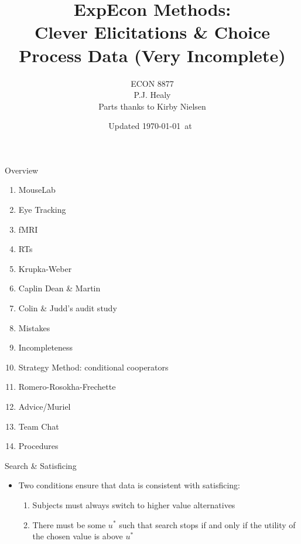 

\title[Incentives in Experiments: Theory]{ExpEcon Methods:\\Clever Elicitations \& Choice Process Data (Very Incomplete)}\author[ECON 8877]{ECON 8877\\P.J. Healy\\Parts thanks to Kirby Nielsen} \color{metrop}
\institute[OSU]{}
\date[]{\vfill {\tiny Updated \today\ at\ \DTMcurrenttime}}



\frame{\maketitle}

\begin{frame}{Overview}
\begin{enumerate}
    \item MouseLab
    \item Eye Tracking
    \item fMRI
    \item RTs
    \item Krupka-Weber
    \item Caplin Dean \& Martin
    \item Colin \& Judd's audit study
    \item Mistakes
    \item Incompleteness
    \item Strategy Method: conditional cooperators
    \item Romero-Rosokha-Frechette
    \item Advice/Muriel
    \item Team Chat
    \item Procedures
\end{enumerate}
\end{frame}



\begin{frame}{Search \& Satisficing}
\begin{itemize}
    \item Two conditions ensure that data is consistent with satisficing:
    \begin{enumerate}
        \item Subjects must always switch to higher value alternatives
        \item There must be some $u^*$ such that search stops if and only if the utility of the chosen value is above $u^*$
    \end{enumerate}
\end{itemize}    
\end{frame}

